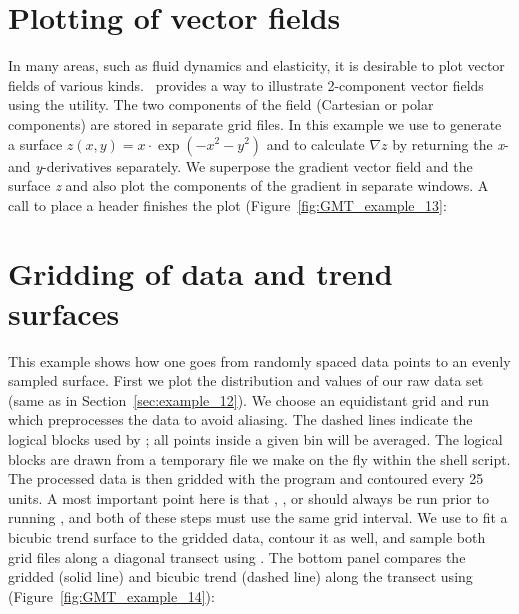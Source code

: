 

\section{Plotting of vector fields}

In many areas, such as fluid dynamics and elasticity,
it is desirable to plot vector fields of various kinds.
\GMT\ provides a way to illustrate 2-component vector fields
using the  utility.  The two components of
the field (Cartesian or polar components) are stored in
separate grid files.  In this example we use 
to generate a surface $z(x, y) = x \cdot \exp(-x^2 -y^2)$
and to calculate $\nabla z$ by
returning the {\it x}- and {\it y}-derivatives separately.
We superpose the gradient vector field and the surface
{\it z} and also plot the components of the gradient
in separate windows.
A  call to place a header finishes the plot
(Figure~\ref{fig:GMT_example_13}:



\section{Gridding of data and trend surfaces}

This example shows how one goes from randomly spaced data
points to an evenly sampled surface.  First we plot the
distribution and values of our raw data set (same as in
Section~\ref{sec:example_12}).  We choose an equidistant grid and run
 which preprocesses the data to avoid aliasing.
The dashed lines indicate the logical blocks used by
; all points inside a given bin will be averaged.
The logical blocks are drawn from a temporary file we make on
the fly within the shell script.  The processed data is then
gridded with the  program and contoured every 25
units.  A most important point here is that ,
, or  should always be run
prior to running , and both of these steps must use the same
grid interval.  We use  to fit a bicubic trend
surface to the gridded data, contour it as well, and sample
both grid files along a diagonal transect using .
The bottom panel compares the gridded (solid line) and bicubic
trend (dashed line) along the transect using 
(Figure~\ref{fig:GMT_example_14}):

